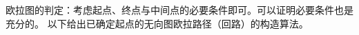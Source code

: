 欧拉图的判定：考虑起点、终点与中间点的必要条件即可。可以证明必要条件也是充分的。
以下给出已确定起点的无向图欧拉路径（回路）的构造算法。
\inputminted{cpp}{src/graph/euler-path.cpp}
